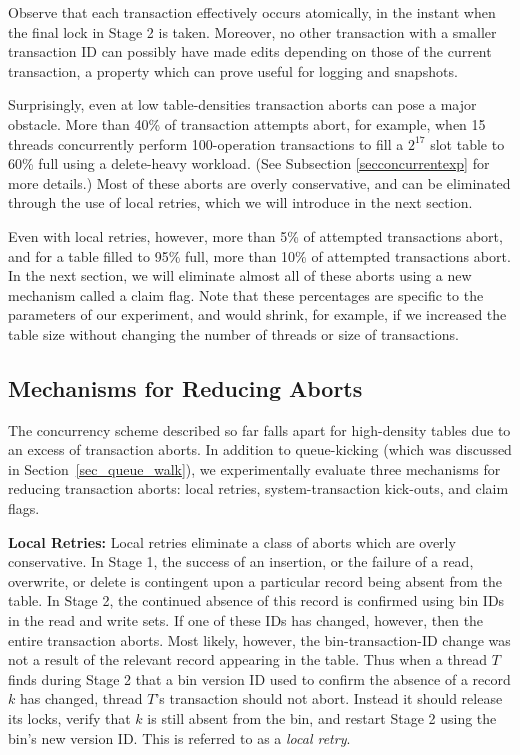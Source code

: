 \documentclass{sig-alternate-05-2015}
\begin{document}
Observe that each transaction effectively occurs atomically, in the
instant when the final lock in Stage 2 is taken.  Moreover, no other
transaction with a smaller transaction ID can possibly have made edits
depending on those of the current transaction, a property which can
prove useful for logging and snapshots.

Surprisingly, even at low table-densities transaction aborts can pose
a major obstacle. More than 40\% of transaction attempts abort, for
example, when 15 threads concurrently perform 100-operation
transactions to fill a $2^{17}$ slot table to 60\% full using a
delete-heavy workload. (See Subsection \ref{secconcurrentexp} for more
details.) Most of these aborts are overly conservative, and can be
eliminated through the use of local retries, which we will introduce
in the next section.

Even with local retries, however, more than 5\% of attempted
transactions abort, and for a table filled to 95\% full, more than
10\% of attempted transactions abort. In the next section, we will
eliminate almost all of these aborts using a new mechanism called a
claim flag. Note that these percentages are specific to the parameters
of our experiment, and would shrink, for example, if we increased the
table size without changing the number of threads or size of
transactions.



\subsection{Mechanisms for Reducing Aborts}\label{secmech}

The concurrency scheme described so far falls apart for high-density
tables due to an excess of transaction aborts. In addition to
queue-kicking (which was discussed in Section~\ref{sec_queue_walk}),
we experimentally evaluate three mechanisms for reducing transaction
aborts: local retries, system-transaction kick-outs, and claim flags.

\textbf{Local Retries: } Local retries eliminate a class of aborts
which are overly conservative. In Stage 1, the success of an
insertion, or the failure of a read, overwrite, or delete is
contingent upon a particular record being absent from the table. In
Stage 2, the continued absence of this record is confirmed using bin
IDs in the read and write sets. If one of these IDs has changed,
however, then the entire transaction aborts. Most likely, however, the
bin-transaction-ID change was not a result of the relevant record
appearing in the table. Thus when a thread $T$ finds during Stage 2
that a bin version ID used to confirm the absence of a record $k$ has
changed, thread $T$'s transaction should not abort. Instead it should
release its locks, verify that $k$ is still absent from the bin, and
restart Stage 2 using the bin's new version ID. This is referred to as
a \emph{local retry}.
\end{document}
